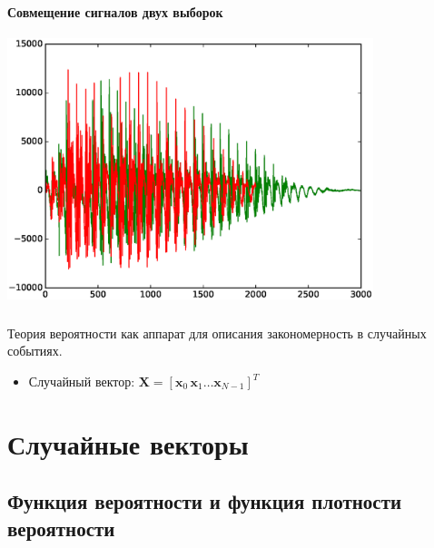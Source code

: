 \documentclass{beamer}
\begin{document}
\begin{frame}
  \frametitle{\insertsection}
  \framesubtitle{Совмещение сигналов двух выборок}
  \includegraphics[width=0.8\textwidth]{a1a2.eps}
\end{frame}

\begin{frame}
  \frametitle{\insertsection}
  \framesubtitle{\insertsubsection}
  
  \begin{center}
  Теория вероятности как аппарат для описания закономерность в случайных событиях. 
  \end{center} \pause
  \begin{itemize}
  \item Случайный вектор: $ \mathbf{X} = [\mathbf{x}_0\, \mathbf{x}_1 \ldots \mathbf{x}_{N - 1}]^T $
  \end{itemize}

\end{frame}

\section{Случайные векторы}
\subsection{Функция вероятности и функция плотности вероятности}
\end{document}
